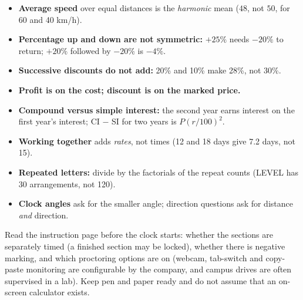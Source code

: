 \documentclass[10pt,a4paper,openany,oneside]{report}
\begin{document}
\begin{trapbox}
\begin{itemize}[nosep]
\item \textbf{Average speed} over equal distances is the \emph{harmonic} mean ($48$, not $50$, for 60 and 40 km/h).
\item \textbf{Percentage up and down are not symmetric:} $+25\%$ needs $-20\%$ to return; $+20\%$ followed by $-20\%$ is $-4\%$.
\item \textbf{Successive discounts do not add:} 20\% and 10\% make 28\%, not 30\%.
\item \textbf{Profit is on the cost; discount is on the marked price.}
\item \textbf{Compound versus simple interest:} the second year earns interest on the first year's interest; CI $-$ SI for two years is $P(r/100)^2$.
\item \textbf{Working together} adds \emph{rates}, not times (12 and 18 days give 7.2 days, not 15).
\item \textbf{Repeated letters:} divide by the factorials of the repeat counts (LEVEL has 30 arrangements, not 120).
\item \textbf{Clock angles} ask for the smaller angle; direction questions ask for distance \emph{and} direction.
\end{itemize}
\end{trapbox}

\begin{tipbox}
Read the instruction page before the clock starts: whether the sections are separately timed (a finished section may be locked), whether there is negative marking, and which proctoring options are on (webcam, tab-switch and copy-paste monitoring are configurable by the company, and campus drives are often supervised in a lab). Keep pen and paper ready and do not assume that an on-screen calculator exists.
\end{tipbox}
\end{document}

